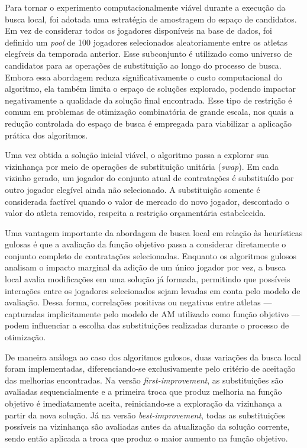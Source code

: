 Para tornar o experimento computacionalmente viável durante a execução da busca local, foi adotada uma estratégia de amostragem do espaço de candidatos. 
Em vez de considerar todos os jogadores disponíveis na base de dados, foi definido um \textit{pool} de 100 jogadores selecionados aleatoriamente entre 
os atletas elegíveis da temporada anterior. Esse subconjunto é utilizado como universo de candidatos para as operações de substituição ao longo do processo de 
busca. Embora essa abordagem reduza significativamente o custo computacional do algoritmo, ela também limita o espaço de soluções explorado, podendo 
impactar negativamente a qualidade da solução final encontrada. Esse tipo de restrição é comum em problemas de otimização combinatória de grande escala, 
nos quais a redução controlada do espaço de busca é empregada para viabilizar a aplicação prática dos algoritmos.

Uma vez obtida a solução inicial viável, o algoritmo passa a explorar sua vizinhança por meio de operações de substituição unitária (\textit{swap}). 
Em cada vizinho gerado, um jogador do conjunto atual de contratações é substituído por outro jogador elegível ainda não selecionado. A substituição 
somente é considerada factível quando o valor de mercado do novo jogador, descontado o valor do atleta removido, respeita a restrição orçamentária estabelecida.

Uma vantagem importante da abordagem de busca local em relação às heurísticas gulosas é que a avaliação da função objetivo passa a considerar diretamente 
o conjunto completo de contratações selecionadas. Enquanto os algoritmos gulosos analisam o impacto marginal da adição de um único jogador por vez, 
a busca local avalia modificações em uma solução já formada, permitindo que possíveis interações entre os jogadores selecionados sejam levadas em 
conta pelo modelo de avaliação. Dessa forma, correlações positivas ou negativas entre atletas — capturadas implicitamente pelo modelo de AM 
utilizado como função objetivo — podem influenciar a escolha das substituições realizadas durante o processo de otimização.

De maneira análoga ao caso dos algoritmos gulosos, duas variações da busca local foram implementadas, diferenciando-se exclusivamente pelo 
critério de aceitação das melhorias encontradas. Na versão \textit{first-improvement}, as substituições são avaliadas sequencialmente e a primeira 
troca que produz melhoria na função objetivo é imediatamente aceita, reiniciando-se a exploração da vizinhança a partir da nova solução. 
Já na versão \textit{best-improvement}, todas as substituições possíveis na vizinhança são avaliadas antes da atualização da solução corrente, 
sendo então aplicada a troca que produz o maior aumento na função objetivo.

